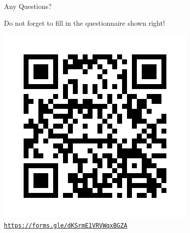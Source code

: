 \documentclass[aspectratio=169, 12pt, xcolor=table]{beamer}
\newcommand{\ohref}[1]{\href{#1}{\texttt{#1}}}
\begin{document}
	\begin{frame}{Any Questions?}
		\begin{minipage}{0.35\textwidth}
			\raggedright
			Do not forget to fill in the questionnaire shown right!
		\end{minipage}\hfill
		\begin{minipage}{0.58\textwidth}
			\vspace{0pt}
			\raggedleft
			\includegraphics[scale=0.4]{./assets/post_lesson_assessment.png}
			\centering
			\ohref{https://forms.gle/dKSrmE1VRVWqxBGZA}
		\end{minipage}
	\end{frame}
	
\end{document}
